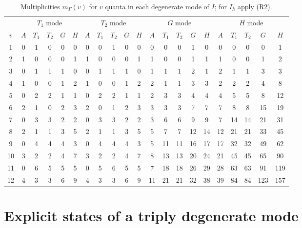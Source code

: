 \documentclass[11pt]{article}
\begin{document}
\begin{table}[H]
\centering\small
\setlength{\tabcolsep}{3.5pt}
\begin{tabular}{c|ccccc|ccccc|ccccc|ccccc}
\hline
 & \multicolumn{5}{c|}{$T_{1}$ mode} & \multicolumn{5}{c|}{$T_{2}$ mode} & \multicolumn{5}{c|}{$G$ mode} & \multicolumn{5}{c}{$H$ mode}\\
$v$ & $A$ & $T_{1}$ & $T_{2}$ & $G$ & $H$ & $A$ & $T_{1}$ & $T_{2}$ & $G$ & $H$ & $A$ & $T_{1}$ & $T_{2}$ & $G$ & $H$ & $A$ & $T_{1}$ & $T_{2}$ & $G$ & $H$\\
\hline
1 & 0 & 1 & 0 & 0 & 0 & 0 & 0 & 1 & 0 & 0 & 0 & 0 & 0 & 1 & 0 & 0 & 0 & 0 & 0 & 1\\
2 & 1 & 0 & 0 & 0 & 1 & 1 & 0 & 0 & 0 & 1 & 1 & 0 & 0 & 1 & 1 & 1 & 0 & 0 & 1 & 2\\
3 & 0 & 1 & 1 & 1 & 0 & 0 & 1 & 1 & 1 & 0 & 1 & 1 & 1 & 2 & 1 & 2 & 1 & 1 & 3 & 3\\
4 & 1 & 0 & 0 & 1 & 2 & 1 & 0 & 0 & 1 & 2 & 2 & 1 & 1 & 3 & 3 & 2 & 2 & 2 & 4 & 8\\
5 & 0 & 2 & 2 & 1 & 1 & 0 & 2 & 2 & 1 & 1 & 2 & 3 & 3 & 4 & 4 & 4 & 5 & 5 & 8 & 12\\
6 & 2 & 1 & 0 & 2 & 3 & 2 & 0 & 1 & 2 & 3 & 3 & 3 & 3 & 7 & 7 & 7 & 8 & 8 & 15 & 19\\
7 & 0 & 3 & 3 & 2 & 2 & 0 & 3 & 3 & 2 & 2 & 3 & 6 & 6 & 9 & 9 & 7 & 14 & 14 & 21 & 31\\
8 & 2 & 1 & 1 & 3 & 5 & 2 & 1 & 1 & 3 & 5 & 5 & 7 & 7 & 12 & 14 & 12 & 21 & 21 & 33 & 45\\
9 & 0 & 4 & 4 & 4 & 3 & 0 & 4 & 4 & 4 & 3 & 5 & 11 & 11 & 16 & 17 & 17 & 32 & 32 & 49 & 62\\
10 & 3 & 2 & 2 & 4 & 7 & 3 & 2 & 2 & 4 & 7 & 8 & 13 & 13 & 20 & 24 & 21 & 45 & 45 & 65 & 90\\
11 & 0 & 6 & 5 & 5 & 5 & 0 & 5 & 6 & 5 & 5 & 7 & 18 & 18 & 26 & 29 & 28 & 63 & 63 & 91 & 119\\
12 & 4 & 3 & 3 & 6 & 9 & 4 & 3 & 3 & 6 & 9 & 11 & 21 & 21 & 32 & 38 & 39 & 84 & 84 & 123 & 157\\
\hline
\end{tabular}
\caption{Multiplicities $m_\Gamma(v)$ for $v$ quanta in each degenerate mode of $I$; for $I_h$ apply (R2).}
\label{tab:ico}
\end{table}

\section{Explicit states of a triply degenerate mode}
\end{document}
